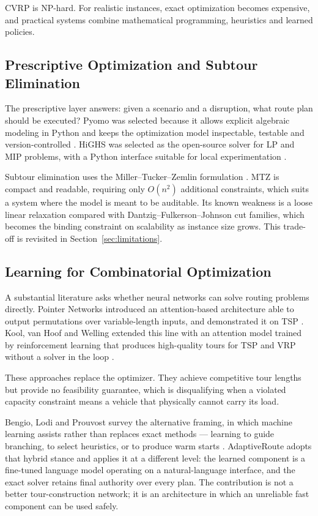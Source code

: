 \documentclass[11pt,a4paper]{article}
\begin{document}
CVRP is NP-hard. For realistic instances, exact optimization becomes expensive, and practical
systems combine mathematical programming, heuristics and learned policies.

\subsection{Prescriptive Optimization and Subtour Elimination}

The prescriptive layer answers: given a scenario and a disruption, what route plan should be
executed? Pyomo was selected because it allows explicit algebraic modeling in Python and keeps the
optimization model inspectable, testable and version-controlled \cite{pyomo}. HiGHS was selected as
the open-source solver for LP and MIP problems, with a Python interface suitable for local
experimentation \cite{highs}.

Subtour elimination uses the Miller--Tucker--Zemlin formulation \cite{mtz}. MTZ is compact and
readable, requiring only $O(n^2)$ additional constraints, which suits a system where the model is
meant to be auditable. Its known weakness is a loose linear relaxation compared with
Dantzig--Fulkerson--Johnson cut families, which becomes the binding constraint on scalability as
instance size grows. This trade-off is revisited in Section~\ref{sec:limitations}.

\subsection{Learning for Combinatorial Optimization}

A substantial literature asks whether neural networks can solve routing problems directly. Pointer
Networks introduced an attention-based architecture able to output permutations over variable-length
inputs, and demonstrated it on TSP \cite{pointer}. Kool, van Hoof and Welling extended this line with
an attention model trained by reinforcement learning that produces high-quality tours for TSP and
VRP without a solver in the loop \cite{kool2019}.

These approaches replace the optimizer. They achieve competitive tour lengths but provide no
feasibility guarantee, which is disqualifying when a violated capacity constraint means a vehicle
that physically cannot carry its load.

Bengio, Lodi and Prouvost survey the alternative framing, in which machine learning assists rather
than replaces exact methods --- learning to guide branching, to select heuristics, or to produce
warm starts \cite{bengio2021}. AdaptiveRoute adopts that hybrid stance and applies it at a different
level: the learned component is a fine-tuned language model operating on a natural-language
interface, and the exact solver retains final authority over every plan. The contribution is not a
better tour-construction network; it is an architecture in which an unreliable fast component can be
used safely.
\end{document}
